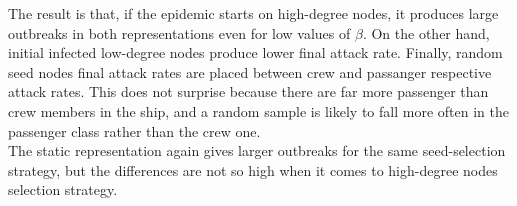The result is that, if the epidemic starts on high-degree nodes, it produces large outbreaks in both representations even for low values of $\beta$. On the other hand, initial infected low-degree nodes produce lower final attack rate. Finally, random seed nodes final attack rates are placed between crew and passanger respective attack rates.
This does not surprise because there are far more passenger than crew members in the ship, and a random sample is likely to fall more often in the passenger class rather than the crew one.\\
The static representation again gives larger outbreaks for the same seed-selection strategy, but the differences are not so high when it comes to high-degree nodes selection strategy.
